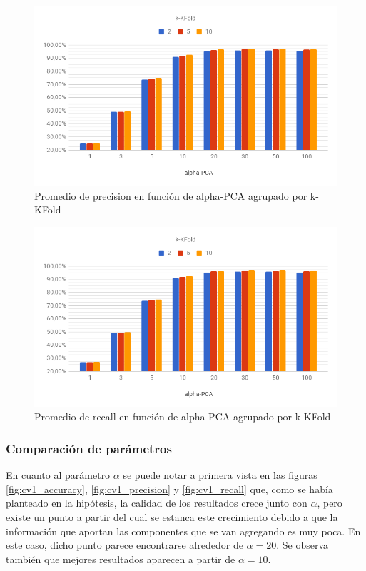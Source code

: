 \begin{figure}[h]
    \centering
    \includegraphics[width=\textwidth]{graficos/cv_cmp_folds_precision.png}
    \caption{Promedio de precision en función de alpha-PCA agrupado por k-KFold}
    \label{fig:cv_cmp_folds_precision}
\end{figure}

\begin{figure}[H]
    \centering
    \includegraphics[width=\textwidth]{graficos/cv_cmp_folds_recall.png}
    \caption{Promedio de recall en función de alpha-PCA agrupado por k-KFold}
    \label{fig:cv_cmp_folds_recall}
\end{figure}

\subsubsection{Comparación de parámetros}

En cuanto al parámetro $\alpha$ se puede notar a primera vista en las figuras \ref{fig:cv1_accuracy}, \ref{fig:cv1_precision} y \ref{fig:cv1_recall} que, como se había planteado en la hipótesis, la calidad de los resultados crece junto con $\alpha$, pero existe un punto a partir del cual se estanca este crecimiento debido a que la información que aportan las componentes que se van agregando es muy poca. En este caso, dicho punto parece encontrarse alrededor de $\alpha = 20$. Se observa también que mejores resultados aparecen a partir de $\alpha = 10$.

